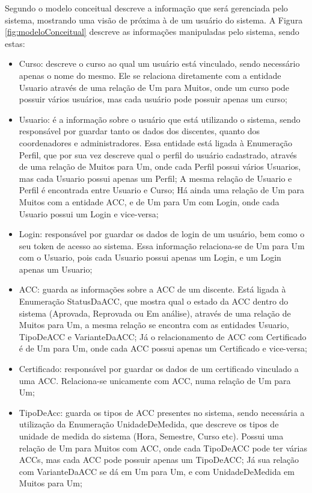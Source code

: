 Segundo \cite{wazlawick2014analise} o modelo conceitual descreve a informação que será gerenciada pelo sistema, mostrando uma visão de próxima à de um usuário do sistema. A Figura \ref{fig:modeloConceitual} descreve as informações manipuladas pelo sistema, sendo estas:
\begin{itemize}
    \item Curso: descreve o curso ao qual um usuário está vinculado, sendo necessário apenas o nome do mesmo. Ele se relaciona diretamente com a entidade Usuario através de uma relação de Um para Muitos, onde um curso pode possuir vários usuários, mas cada usuário pode possuir apenas um curso;
    \item Usuario: é a informação sobre o usuário que está utilizando o sistema, sendo responsável por guardar tanto os dados dos discentes, quanto dos coordenadores e administradores. Essa entidade está ligada à Enumeração Perfil, que por sua vez descreve qual o perfil do usuário cadastrado, através de uma relação de Muitos para Um, onde cada Perfil possui vários Usuarios, mas cada Usuario possui apenas um Perfil; A mesma relação de Usuario e Perfil é encontrada entre Usuario e Curso; Há ainda uma relação de Um para Muitos com a entidade ACC, e de Um para Um com Login, onde cada Usuario possui um Login e vice-versa;
    \item Login: responsável por guardar os dados de login de um usuário, bem como o seu token de acesso ao sistema. Essa informação relaciona-se de Um para Um com o Usuario, pois cada Usuario possui apenas um Login, e um Login apenas um Usuario;
    \item ACC: guarda as informações sobre a ACC de um discente. Está ligada à Enumeração StatusDaACC, que mostra qual o estado da ACC dentro do sistema (Aprovada, Reprovada ou Em análise), através de uma relação de Muitos para Um, a mesma relação se encontra com as entidades Usuario, TipoDeACC e VarianteDaACC; Já o relacionamento de ACC com Certificado é de Um para Um, onde cada ACC possui apenas um Certificado e vice-versa;
    \item Certificado: responsável por guardar os dados de um certificado vinculado a uma ACC. Relaciona-se unicamente com ACC, numa relação de Um para Um;
    \item TipoDeAcc: guarda os tipos de ACC presentes no sistema, sendo necessária a utilização da Enumeração UnidadeDeMedida, que descreve os tipos de unidade de medida do sistema (Hora, Semestre, Curso etc). Possui uma relação de Um para Muitos com ACC, onde cada TipoDeACC pode ter várias ACCs, mas cada ACC pode possuir apenas um TipoDeACC; Já sua relação com VarianteDaACC se dá em Um para Um, e com UnidadeDeMedida em Muitos para Um;

\end{itemize}
